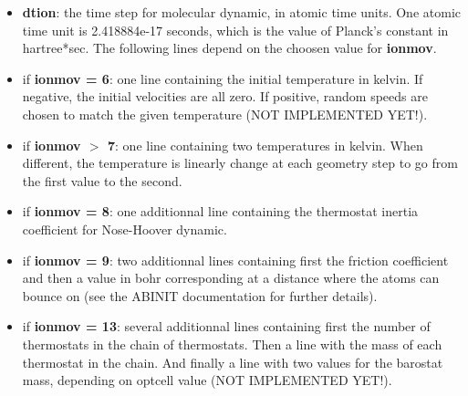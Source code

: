 \documentclass[a4paper,11pt]{report}
\begin{document}
\begin{itemize}
\begin{itemize}
                         \end{itemize}
\item  \textbf{dtion}: the time step for molecular dynamic, in atomic time units. One atomic time unit is 2.418884e-17 seconds, which is the value of Planck's constant in hartree*sec. The following lines depend on the choosen value for \textbf{ionmov}.
\item  if \textbf{ionmov = 6}: one line containing the initial temperature in kelvin. If negative, the initial velocities are all zero. If positive, random speeds are chosen to match the given temperature (NOT IMPLEMENTED YET!).
\item  if \textbf{ionmov $>$ 7}: one line containing two temperatures in kelvin. When different, the temperature is linearly change at each geometry step to go from the first value to the second.
\item  if \textbf{ionmov = 8}: one additionnal line containing the thermostat inertia coefficient for Nose-Hoover dynamic.
\item  if \textbf{ionmov = 9}: two additionnal lines containing first the friction coefficient and then a value in bohr corresponding at a distance where the atoms can bounce on (see the ABINIT documentation for further details).
\item  if \textbf{ionmov = 13}: several additionnal lines containing first the number of thermostats in the chain of thermostats. Then a line with the mass of each thermostat in the chain. And finally a line with two values for the barostat mass, depending on optcell value (NOT IMPLEMENTED YET!).


\end{itemize}
\end{document}
